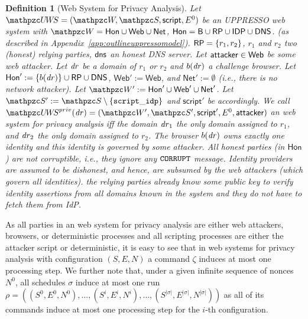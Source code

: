 \documentclass[letterpaper,onecolumn,10pt]{article}
\newtheorem{definition}{Definition}
\begin{document}
\begin{definition}[\uppresso Web System for Privacy Analysis]\label{def:uppresso-ws-priv}
  Let $\uppressowebsystem = (\bidsystem, \scriptset, \mathsf{script}, E^0)$ 
  be an UPPRESSO web system with 
  $\bidsystem = \mathsf{Hon} \cup \mathsf{Web} \cup \mathsf{Net}$, 
  $\mathsf{Hon} = \mathsf{B} \cup \mathsf{RP} \cup \mathsf{IDP} \cup \mathsf{DNS}$.
  (as described in Appendix~\ref{app:outlineuppressomodel}).
  $\mathsf{RP} = \{r_1,r_2\}$, $r_1$ and $r_2$ two (honest) relying parties,
  $\mathsf{dns}$ an honest DNS server. 
  Let $\mathsf{attacker} \in \mathsf{Web}$ be some web attacker.
  Let $\mathit{dr}$ be a domain of $r_1$ or $r_2$ and $b(\mathit{dr})$ a challenge browser. 
  Let $\mathsf{Hon}' := \{ b(\mathit{dr}) \} \cup \mathsf{RP} \cup \mathsf{DNS}$, $\mathsf{Web}' := \mathsf{Web}$, 
  and $\mathsf{Net}' := \emptyset$ (i.e., there is no network attacker).
  Let $\bidsystem' := \mathsf{Hon}' \cup \mathsf{Web}' \cup \mathsf{Net}'$.  
  Let $\scriptset' := \scriptset \setminus \{\str{script\_idp}\}$ and $\mathsf{script}'$ be accordingly.
  We call $\uppressoprivwebsystem(\mi{dr}) = (\bidsystem', \scriptset', \mathsf{script}', E^0, \fAP{attacker})$ 
  an \emph{\uppresso web system for privacy analysis} 
  iff the domain $\mathit{dr}_1$ the only domain assigned to $r_1$, and
  $\mathit{dr}_2$ the only domain assigned to $r_2$. The browser
  $b(\mathit{dr})$ owns exactly one identity and this identity
  is governed by some attacker.  All honest parties (in
  $\mathsf{Hon}$) are not corruptible, i.e., they ignore any
  $\mathtt{CORRUPT}$ message. Identity providers are assumed to be
  dishonest, and hence, are subsumed by the web attackers (which
  govern all identities). %
  the relying
  parties already know some public key to verify \uppresso identity
  assertions from all domains known in the system and they do not have to fetch them from IdP.
\end{definition}

As all parties in an \uppresso web system for privacy analysis are either web 
attackers, browsers, or deterministic processes and all scripting processes are 
either the attacker script or deterministic, it is easy to see that in \uppresso 
web systems for privacy analysis with configuration $(S,E,N)$ a command $\zeta$ 
induces at most one processing step. We further note that, under a given infinite 
sequence of nonces $N^0$, all schedules $\sigma$ induce at most one run 
$\rho = ((S^0,E^0,N^0),\dots,(S^i,E^i,N^i),\dots,(S^{|\sigma|},E^{|\sigma|},N^{|\sigma|}))$ 
as all of its commands induce at most one processing step for the $i$-th configuration.
\end{document}
